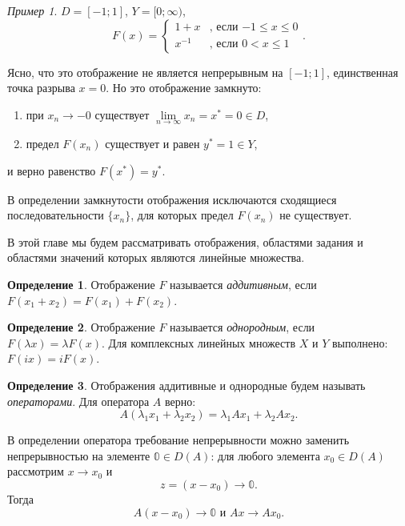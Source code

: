 \documentclass[12pt,a4paper,titlepage,oneside]{book}
\theoremstyle{definition}
\newtheorem*{definition}{Определение}
\theoremstyle{plain}
\theoremstyle{break}
\theoremstyle{remark}
\theoremstyle{remark}
\newtheorem*{example}{Пример}
\theoremstyle{remark}
\theoremstyle{remark}
\theoremstyle{plain}
\theoremstyle{plain}
\begin{document}
\begin{example}
$D=[-1;1]$, $Y=[0;\infty)$,
\begin{equation*}
F(x) = 
\begin{cases}
   1+x &\text{, если $-1\leqslant x \leqslant 0$}\\
   x^{-1} &\text{, если $0< x \leqslant 1$}
\end{cases}
.
\end{equation*}

Ясно, что это отображение не является непрерывным на $[-1;1]$, единственная точка разрыва $x=0$. Но это отображение замкнуто:

\begin{enumerate}

 \item при $x_n \to -0$ существует $\lim \limits_{n \to \infty} x_n= x^*=0 \in D$,
 
 \item предел $F(x_n)$ существует и равен $y^*=1 \in Y$,
 
\end{enumerate}
и верно равенство $F(x^*)=y^*$.

\end{example}

В определении замкнутости отображения исключаются сходящиеся последовательности $\lbrace x_n \rbrace$, для которых предел $F(x_n)$ не существует.

В этой главе мы будем рассматривать отображения, областями задания и областями значений которых являются линейные множества.

\begin{definition}
Отображение $F$ называется \textit{аддитивным}, если $F(x_1+x_2)=F(x_1)+F(x_2)$.
\end{definition}

\begin{definition}
Отображение $F$ называется \textit{однородным}, если $F(\lambda x)=\lambda F(x)$. Для комплексных линейных множеств $X$ и $Y$ выполнено: $F(ix)=iF(x)$.
\end{definition}

\begin{definition}
Отображения аддитивные и однородные будем называть \textit{операторами}. Для оператора $A$ верно:
$$A(\lambda_1x_1+\lambda_2x_2)=\lambda_1Ax_1+\lambda_2Ax_2.$$

\end{definition}

В определении оператора требование непрерывности можно заменить непрерывностью на элементе $\mathbb{0} \in D(A)$: для любого элемента $x_0\in D(A)$ рассмотрим $x \to x_0$ и 
$$z=(x-x_0) \to \mathbb{0}.$$
Тогда 
$$A(x-x_0)\to \mathbb{0} \mbox{ и } Ax \to Ax_0.$$
\end{document}
